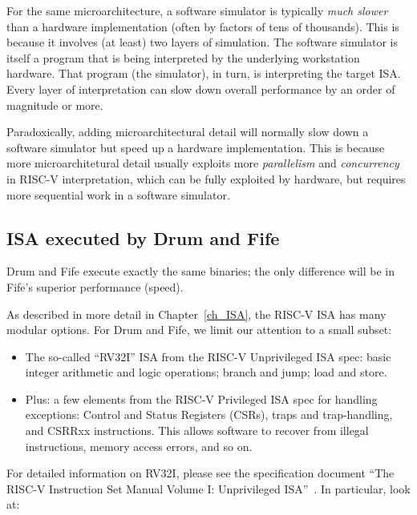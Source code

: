For the same microarchitecture, a software simulator is typically
\emph{much slower} than a hardware implementation (often by factors of
tens of thousands).  This is because it involves (at least) two layers
of simulation. The software simulator is itself a program that is
being interpreted by the underlying workstation hardware.  That
program (the simulator), in turn, is interpreting the target ISA.
Every layer of interpretation can slow down overall performance by
an order of magnitude or more.

Paradoxically, adding microarchitectural detail will normally slow
down a software simulator but speed up a hardware implementation.
This is because more microarchitetural detail usually exploits more
\emph{parallelism} and \emph{concurrency} in RISC-V interpretation,
which can be fully exploited by hardware, but requires more sequential
work in a software simulator.


\subsection{ISA executed by Drum and Fife}

Drum and Fife execute exactly the same binaries; the only difference
will be in Fife's superior performance (speed).

As described in more detail in Chapter~\ref{ch_ISA}, the RISC-V ISA
has many modular options.  For Drum and Fife, we limit our attention
to a small subset:

\begin{itemize}
		  
 \item The so-called ``RV32I'' ISA from the RISC-V Unprivileged ISA
       spec: basic integer arithmetic and logic operations; branch and
       jump; load and store.

 \item Plus: a few elements from the RISC-V Privileged ISA spec for
       handling exceptions: Control and Status Registers (CSRs), traps
       and trap-handling, and CSRRxx instructions.  This allows
       software to recover from illegal instructions, memory access
       errors, and so on.

\end{itemize}

For detailed information on RV32I, please see the specification
document ``The RISC-V Instruction Set Manual Volume I: Unprivileged
ISA''~\cite{RISCV_Unpriv_2019_12_13}.  In particular, look at:

